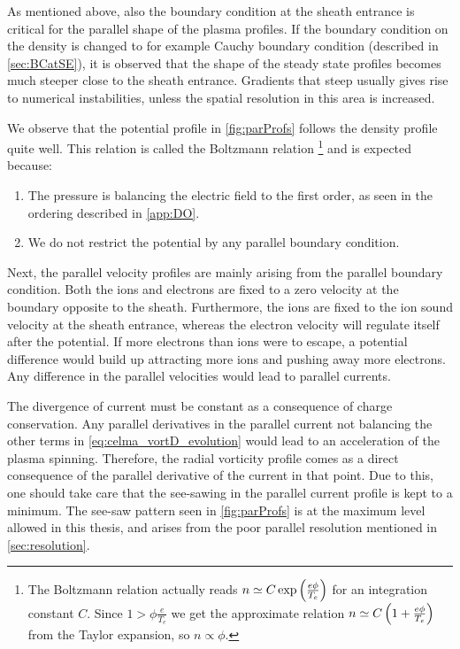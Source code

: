 As mentioned above, also the boundary condition at the sheath entrance is critical for the parallel shape of the plasma profiles.
If the boundary condition on the density is changed to for example Cauchy boundary condition (described in \cref{sec:BCatSE}), it is observed that the shape of the steady state profiles becomes much steeper close to the sheath entrance.
Gradients that steep usually gives rise to numerical instabilities, unless the spatial resolution in this area is increased.

We observe that the potential profile in \cref{fig:parProfs} follows the density profile quite well.
This relation is called the Boltzmann relation%
\footnote{The Boltzmann relation actually reads $n \simeq C\exp\left(\frac{e\phi}{T_e}\right)$ for an integration constant $C$.
    Since $1 > \phi\frac{e}{T_e}$ we get the approximate relation $n \simeq C\left(1+\frac{e\phi}{T_e}\right)$ from the Taylor expansion, so $n\propto\phi$.
}
%
and is expected because:
%
\begin{enumerate}[noitemsep]
        \item The pressure is balancing the electric field to the first order, as seen in the ordering described in \ref{app:DO}.
        \item We do not restrict the potential by any parallel boundary condition.
\end{enumerate}
%

Next, the parallel velocity profiles are mainly arising from the parallel boundary condition.
Both the ions and electrons are fixed to a zero velocity at the boundary opposite to the sheath.
Furthermore, the ions are fixed to the ion sound velocity at the sheath entrance, whereas the electron velocity will regulate itself after the potential.
If more electrons than ions were to escape, a potential difference would build up attracting more ions and pushing away more electrons.
%
%
Any difference in the parallel velocities would lead to parallel currents.

The divergence of current must be constant as a consequence of charge conservation.
Any parallel derivatives in the parallel current not balancing the other terms in \cref{eq:celma_vortD_evolution} would lead to an acceleration of the plasma spinning.
Therefore, the radial vorticity profile comes as a direct consequence of the parallel derivative of the current in that point.
Due to this, one should take care that the see-sawing in the parallel current profile is kept to a minimum.
The see-saw pattern seen in \cref{fig:parProfs} is at the maximum level allowed in this thesis, and arises from the poor parallel resolution mentioned in \ref{sec:resolution}.

